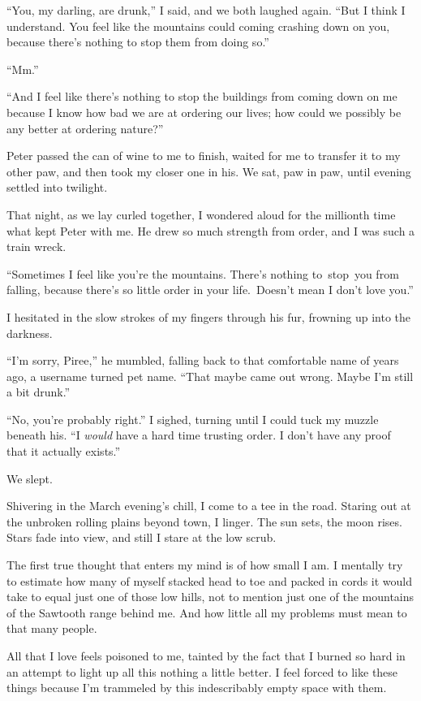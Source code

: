``You, my darling, are drunk,'' I said, and we both laughed again. ``But I think I understand. You feel like the mountains could coming crashing down on you, because there's nothing to stop them from doing so.''

``Mm.''

``And I feel like there's nothing to stop the buildings from coming down on me because I know how bad we are at ordering our lives; how could we possibly be any better at ordering nature?''

Peter passed the can of wine to me to finish, waited for me to transfer it to my other paw, and then took my closer one in his. We sat, paw in paw, until evening settled into twilight.

That night, as we lay curled together, I wondered aloud for the millionth time what kept Peter with me. He drew so much strength from order, and I was such a train wreck.

``Sometimes I feel like you're the mountains. There's nothing to~stop~you from falling, because there's so little order in your life.~Doesn't mean I don't love you.''

I hesitated in the slow strokes of my fingers through his fur, frowning up into the darkness.

``I'm sorry, Piree,'' he mumbled, falling back to that comfortable name of years ago, a username turned pet name. ``That maybe came out wrong. Maybe I'm still a bit drunk.''

``No, you're probably right.'' I sighed, turning until I could tuck my muzzle beneath his. ``I \emph{would} have a hard time trusting order. I don't have any proof that it actually exists.''

We slept.

\secdiv{}

\noindent Shivering in the March evening's chill, I come to a tee in the road. Staring out at the unbroken rolling plains beyond town, I linger. The sun sets, the moon rises. Stars fade into view, and still I stare at the low scrub.

The first true thought that enters my mind is of how small I am. I mentally try to estimate how many of myself stacked head to toe and packed in cords it would take to equal just one of those low hills, not to mention just one of the mountains of the Sawtooth range behind me. And how little all my problems must mean to that many people.

All that I love feels poisoned to me, tainted by the fact that I burned so hard in an attempt to light up all this nothing a little better. I feel forced to like these things because I'm trammeled by this indescribably empty space with them.

